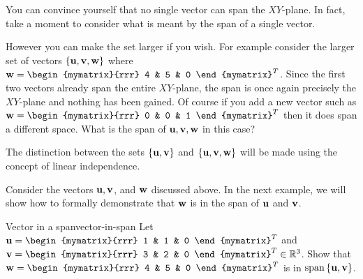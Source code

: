 You can convince yourself that no single vector can span the
$XY$-plane. In fact, take a moment to consider what is meant by the span of a single vector.

However you can make the set larger if you wish. For example consider
the larger set of vectors $\{\mbox{\bf u}, \mbox{\bf v},
\mbox{\bf w}\}$ where $ \vect{w}=\begin{mymatrix}{rrr}
4 & 5 & 0
\end{mymatrix}^T$. 
Since
the first two vectors already span the entire $XY$-plane, the span is
once again precisely the $XY$-plane and nothing has been gained. Of
course if you add a new vector such as
$ \vect{w}=\begin{mymatrix}{rrr}
0 & 0 & 1
\end{mymatrix}^T$ then it does span a different space. What is the span of $\mbox{\bf u}, \mbox{\bf v}, \mbox{\bf w}$ in this case?   

The distinction between the sets $\{\mbox{\bf u}, \mbox{\bf v}\}$ and $\{
\mbox{\bf u}, \mbox{\bf v}, \mbox{\bf w}\}$ will be made using the concept of linear independence. 

Consider the vectors $\mbox{\bf u}, \mbox{\bf v}$, and $\mbox{\bf w}$ discussed above. In the next example, we will show how to formally demonstrate that $\mbox{\bf w}$ is in the span of $\mbox{\bf u}$ and $\mbox{\bf v}$. 

\begin{example}{Vector in a span}{vector-in-span}
Let $\vect{u}=\begin{mymatrix}{rrr}
1  & 1 & 0
\end{mymatrix}^T$ and
$\vect{v}=\begin{mymatrix}{rrr}
3  & 2 & 0
\end{mymatrix}^T \in \R^{3}$. Show that $\vect{w} = \begin{mymatrix}{rrr}
4 & 5 & 0 
\end{mymatrix}^{T}$ is in $\mbox{\rm span} \left\{\mbox{\bf u}, \mbox{\bf v} \right\}$.
\end{example}

